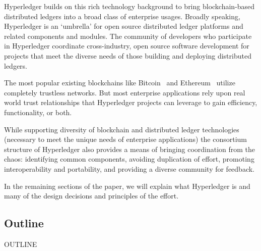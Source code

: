 Hyperledger builds on this rich technology background to bring blockchain-based distributed ledgers into a broad class of enterprise usages.  Broadly speaking, Hyperledger is an `umbrella’ for open source distributed ledger platforms and related components and modules. The community of developers who participate in Hyperledger coordinate cross-industry, open source software development for projects that meet the diverse needs of those building and deploying distributed ledgers. 

The most popular existing blockchains like Bitcoin~\cite{Nak08} and Ethereum~\cite{But13} utilize completely trustless networks.  But most enterprise applications rely upon real world trust relationships that Hyperledger projects can leverage to gain efficiency, functionality, or both.

While supporting diversity of blockchain and distributed ledger technologies (necessary to meet the unique needs of enterprise applications) the consortium structure of Hyperledger also provides a means of bringing coordination from the chaos: identifying common components, avoiding duplication of effort, promoting interoperability and portability, and providing a diverse community for feedback.

In the remaining sections of the paper, we will explain what Hyperledger is and many of the design decisions and principles of the effort.

\subsection{Outline}
OUTLINE
